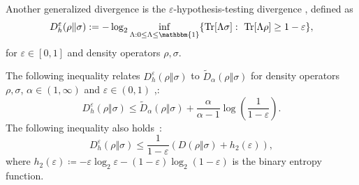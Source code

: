 \documentclass[aps,pra,twocolumn,superscriptaddress,longbibliography]{revtex4-1}
\def\Tr{\operatorname{Tr}}
\def\({\left(}
\def\){\right)}
\newcommand{\wt}[1]{\widetilde{#1}}
\newcommand{\bbm}[1]{\mathbbm{#1}}
\begin{document}
Another generalized divergence  is the $\varepsilon$-hypothesis-testing divergence \cite{BD10,WR12},  defined as
\begin{equation}
D^\varepsilon_h\!\(\rho\Vert\sigma\):=-\log_2\inf_{\Lambda: 0\leq\Lambda\leq \bbm{1}}\{\Tr[\Lambda\sigma]:\  \Tr[\Lambda\rho]\geq 1-\varepsilon\},
\end{equation}
for $\varepsilon\in[0,1]$ and density operators $\rho,\sigma$.

The following inequality relates $D^\varepsilon_h(\rho\Vert \sigma)$ to $\wt{D}_{\alpha}(\rho\Vert\sigma)$ for density operators $\rho,\sigma$, $\alpha\in(1,\infty)$ and $\varepsilon\in(0,1)$ \cite{HP91,N01,ON00},\cite[Lemma~5]{CMW14}:
\begin{equation}\label{eq:hyp-sand-rel}
D^\varepsilon_h(\rho\Vert \sigma)\leq  \wt{D}_{\alpha}(\rho\Vert\sigma)+\frac{\alpha}{\alpha-1}\log\left(\frac{1}{1-\varepsilon}\right).
\end{equation}
The following inequality also holds~\cite{WR12}:
\begin{equation}
D^\varepsilon_h(\rho\Vert\sigma)\leq \frac{1}{1-\varepsilon}\left(D(\rho\Vert\sigma)+h_2(\varepsilon)\right),
\end{equation}
where $h_2(\varepsilon)\coloneqq -\varepsilon\log_2\varepsilon-(1-\varepsilon)\log_2 (1-\varepsilon)$ is the binary entropy function. 
\end{document}
